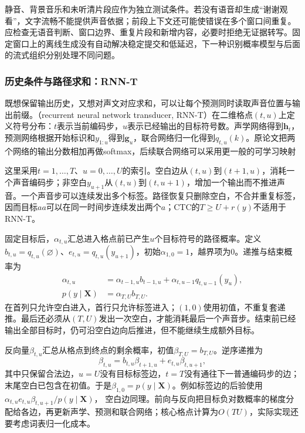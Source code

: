 静音、背景音乐和未听清片段应作为独立测试条件。若没有语音却生成“谢谢观看”，文字流畅不能提供声音依据；前段上下文还可能使错误在多个窗口间重复。应检查无语音判断、窗口边界、重复片段和新增内容，必要时拒绝无证据转写。固定窗口上的离线生成没有自动解决稳定提交和低延迟，下一种识别概率模型与后面的流式组织分别处理不同问题。

\subsubsection{历史条件与路径求和：RNN-T}
\label{sec:nlp-speech-rnnt}

既想保留输出历史，又想对声文对应求和，可以让每个预测同时读取声音位置与输出前缀。（recurrent neural network transducer, RNN-T）在二维格点$(t,u)$上定义符号分布：$t$表示当前编码步，$u$表示已经输出的目标符号数。声学网络得到$\bm{h}_t$，预测网络根据开始标识和$y_{1:u}$得到$\bm{g}_u$，联合网络归一化得到$q_{t,u}(k)$。原论文把两个网络的输出分数相加再做softmax，后续联合网络可以采用更一般的可学习映射

这里采用$t=1,\ldots,T$、$u=0,\ldots,U$的索引。空白边从$(t,u)$到$(t+1,u)$，消耗一个声音编码步；非空白$y_{u+1}$从$(t,u)$到$(t,u+1)$，增加一个输出而不推进声音。一个声音步可以连续发出多个标签。路径恢复只删除空白，不合并重复标签，因而目标$aa$可以在同一时间步连续发出两个$a$；CTC的$T\geq U+r(y)$不适用于RNN-T。

固定目标后，$\alpha_{t,u}$汇总进入格点前已产生$u$个目标符号的路径概率。定义$b_{t,u}=q_{t,u}(\varnothing)$、$e_{t,u}=q_{t,u}(y_{u+1})$，初始$\alpha_{1,0}=1$，越界项为0。递推与结束概率为
\begin{equation}
\begin{aligned}
 \alpha_{t,u}
 &=\alpha_{t-1,u}b_{t-1,u}
   +\alpha_{t,u-1}q_{t,u-1}(y_u),\\
 p(y\mid\bm{X})&=\alpha_{T,U}b_{T,U}.
\end{aligned}
\label{eq:nlp-speech-rnnt-forward}
\end{equation}
在首列只允许空白进入，首行只允许标签进入；$(1,0)$使用初值，不重复套递推。最后还必须从$(T,U)$发出一次空白，才能消耗最后一个声音步。结束前已经输出全部目标时，仍可沿空白边向后推进，但不能继续生成额外目标。

反向量$\beta_{t,u}$汇总从格点到终点的剩余概率，初值$\beta_{T,U}=b_{T,U}$。逆序递推为
\begin{equation}
 \beta_{t,u}=b_{t,u}\beta_{t+1,u}
       +e_{t,u}\beta_{t,u+1},
 \label{eq:nlp-speech-rnnt-backward}
\end{equation}
其中只保留合法边，$u=U$没有目标标签边，$t=T$没有通往下一普通编码步的边；末尾空白已包含在初值。于是$\beta_{1,0}=p(y\mid\bm{X})$。例如标签边的后验使用
$\alpha_{t,u}e_{t,u}\beta_{t,u+1}/p(y\mid\bm{X})$，
空白边同理。前向与反向把目标负对数概率的梯度分配给各边，再更新声学、预测和联合网络；核心格点计算为$O(TU)$，实际实现还要考虑词表归一化成本。

